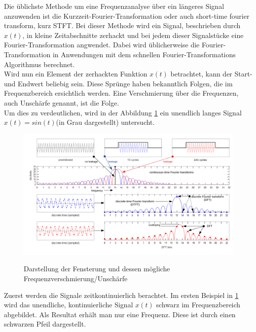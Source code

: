 
Die üblichste Methode um eine Frequenzanalyse über ein längeres Signal anzuwenden ist die  Kurzzeit-Fourier-Transformation oder auch short-time fourier transform, kurz STFT. Bei dieser Methode wird ein Signal, beschrieben durch $x(t)$, in kleine Zeitabschnitte zerhackt und bei jedem dieser Signalstücke eine Fourier-Transformation angwendet. Dabei wird üblicherweise die Fourier-Transformation in Anwendungen mit dem schnellen Fourier-Transformations Algorithmus berechnet.\\

Wird nun ein Element der zerhackten Funktion $x(t)$ betrachtet, kann der Start- und Endwert beliebig sein. Diese Sprünge haben bekanntlich Folgen, die im Frequenzbereich ersichtlich werden. Eine Verschmierung über die Frequenzen, auch Unschärfe genannt, ist die Folge. \\

Um dies zu verdeutlichen, wird in der Abbildung \ref{fig:Spectral} ein unendlich langes Signal $x(t)=sin(t)$(in Grau dargestellt) untersucht. 
\begin{figure}[!ht]
	\centering
	\includegraphics[scale=0.8]{papers/autotune/sections/fft/images/windows/Spectral.pdf}
	\caption{Darstellung der Fensterung und dessen mögliche Frequenzverschmierung/Unschärfe}\cite{wikipedia:Window}
	\label{fig:Spectral}
\end{figure}%

Zuerst werden die Signale zeitkontinuierlich berachtet. Im ersten Beispiel in \ref{fig:Spectral} wird das unendliche, kontinuierliche Signal $x(t)$ schwarz im Frequenzbereich abgebildet. Als Resultat erhält man nur eine Frequenz. Diese ist durch einen schwarzen Pfeil dargestellt.\\

